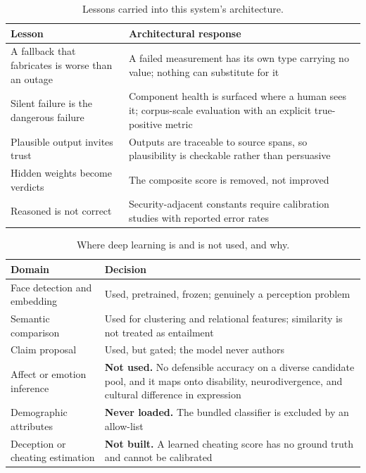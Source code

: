 \begin{table}[t]
\caption{Lessons carried into this system's architecture.}
\label{tab:lessons}
\small
\begin{tabular}{@{}p{2.1cm}p{5.3cm}@{}}
\toprule
Lesson & Architectural response \\
\midrule
A fallback that fabricates is worse than an outage & A failed measurement has its
own type carrying no value; nothing can substitute for it \\
Silent failure is the dangerous failure & Component health is surfaced where a
human sees it; corpus-scale evaluation with an explicit true-positive metric \\
Plausible output invites trust & Outputs are traceable to source spans, so
plausibility is checkable rather than persuasive \\
Hidden weights become verdicts & The composite score is removed, not improved \\
Reasoned is not correct & Security-adjacent constants require calibration studies
with reported error rates \\
\bottomrule
\end{tabular}
\end{table}

\begin{table}[t]
\caption{Where deep learning is and is not used, and why.}
\label{tab:dl-domains}
\small
\begin{tabular}{@{}p{2.0cm}p{5.4cm}@{}}
\toprule
Domain & Decision \\
\midrule
Face detection and embedding & Used, pretrained, frozen; genuinely a perception problem \\
Semantic comparison & Used for clustering and relational features; similarity is
not treated as entailment \\
Claim proposal & Used, but gated; the model never authors \\
Affect or emotion inference & \textbf{Not used.} No defensible accuracy on a
diverse candidate pool, and it maps onto disability, neurodivergence, and
cultural difference in expression \\
Demographic attributes & \textbf{Never loaded.} The bundled classifier is
excluded by an allow-list \\
Deception or cheating estimation & \textbf{Not built.} A learned cheating score
has no ground truth and cannot be calibrated \\
\bottomrule
\end{tabular}
\end{table}

